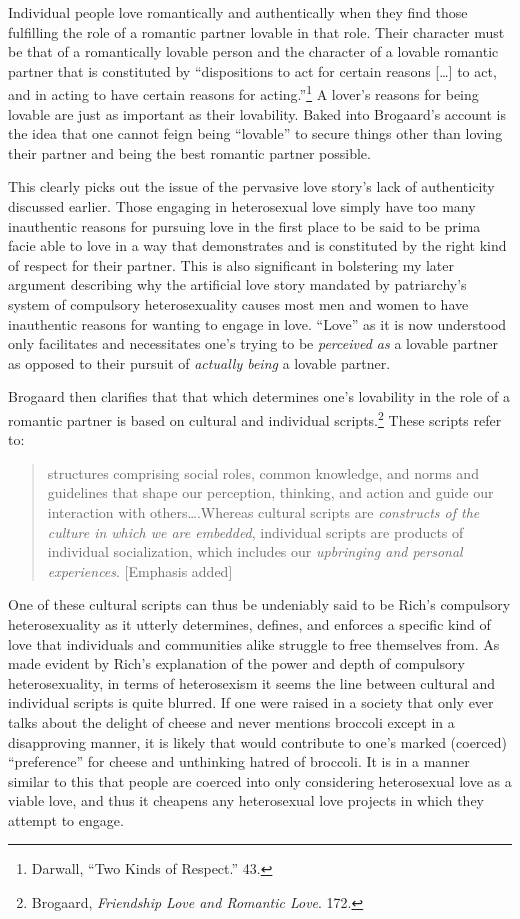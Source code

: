 Individual people love romantically and authentically when they find
those fulfilling the role of a romantic partner lovable in that role.
Their character must be that of a romantically lovable person and the
character of a lovable romantic partner that is constituted by
``dispositions to act for certain reasons [\ldots] to act, and in
acting to have certain reasons for acting.''\footnote{Darwall, ``Two
  Kinds of Respect.'' 43.} A lover's reasons for being lovable are just
as important as their lovability. Baked into Brogaard's account is the
idea that one cannot feign being ``lovable'' to secure things other than
loving their partner and being the best romantic partner possible.

This clearly picks out the issue of the pervasive love story's lack of
authenticity discussed earlier. Those engaging in heterosexual love
simply have too many inauthentic reasons for pursuing love in the first
place to be said to be prima facie able to love in a way that
demonstrates and is constituted by the right kind of respect for their
partner. This is also significant in bolstering my later argument
describing why the artificial love story mandated by patriarchy's system
of compulsory heterosexuality causes most men and women to have
inauthentic reasons for wanting to engage in love. ``Love'' as it is now
understood only facilitates and necessitates one's trying to be
\emph{perceived as} a lovable partner as opposed to their pursuit of
\emph{actually being} a lovable partner.

Brogaard then clarifies that that which determines one's lovability in
the role of a romantic partner is based on cultural and individual
scripts.\footnote{Brogaard, \emph{Friendship Love and Romantic Love}.
  172.} These scripts refer to:

\begin{quote}
structures comprising social roles, common knowledge, and norms and
guidelines that shape our perception, thinking, and action and guide our
interaction with others\ldots.Whereas cultural scripts are
\emph{constructs of the culture in which we are embedded}, individual
scripts are products of individual socialization, which includes our
\emph{upbringing and personal experiences}. [Emphasis added]
\end{quote}

\noindent One of these cultural scripts can thus be undeniably said to be Rich's
compulsory heterosexuality as it utterly determines, defines, and
enforces a specific kind of love that individuals and communities alike
struggle to free themselves from. As made evident by Rich's explanation
of the power and depth of compulsory heterosexuality, in terms of
heterosexism it seems the line between cultural and individual scripts
is quite blurred. If one were raised in a society that only ever talks
about the delight of cheese and never mentions broccoli except in a
disapproving manner, it is likely that would contribute to one's marked
(coerced) ``preference'' for cheese and unthinking hatred of broccoli.
It is in a manner similar to this that people are coerced into only
considering heterosexual love as a viable love, and thus it cheapens any
heterosexual love projects in which they attempt to engage.

